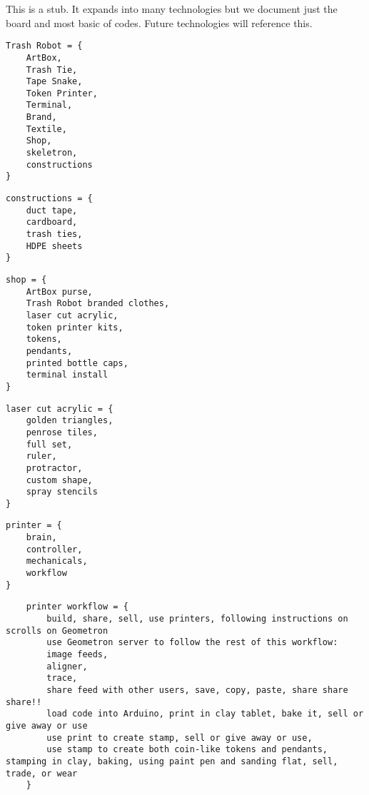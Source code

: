 This is a stub.  It expands into many technologies but we document just the board and most basic of codes.  Future technologies will reference this.

\begin{verbatim}
Trash Robot = {
    ArtBox,
    Trash Tie,
    Tape Snake,
    Token Printer,
    Terminal,
    Brand,
    Textile,
    Shop,
    skeletron,
    constructions
}
\end{verbatim}
    
\begin{verbatim}
constructions = {
    duct tape, 
    cardboard, 
    trash ties, 
    HDPE sheets
}
\end{verbatim}
\begin{verbatim}
shop = {
    ArtBox purse, 
    Trash Robot branded clothes, 
    laser cut acrylic, 
    token printer kits,
    tokens,
    pendants,
    printed bottle caps,
    terminal install
}
\end{verbatim}

\begin{verbatim}
laser cut acrylic = {
    golden triangles, 
    penrose tiles, 
    full set, 
    ruler,
    protractor,
    custom shape,
    spray stencils
}
\end{verbatim}

\begin{verbatim}
printer = {
    brain,
    controller,
    mechanicals,
    workflow
}
\end{verbatim}

\begin{verbatim}
    printer workflow = {
        build, share, sell, use printers, following instructions on scrolls on Geometron
        use Geometron server to follow the rest of this workflow: 
        image feeds,
        aligner,
        trace,
        share feed with other users, save, copy, paste, share share share!!
        load code into Arduino, print in clay tablet, bake it, sell or give away or use
        use print to create stamp, sell or give away or use,
        use stamp to create both coin-like tokens and pendants, stamping in clay, baking, using paint pen and sanding flat, sell, trade, or wear
    }
\end{verbatim}
    
